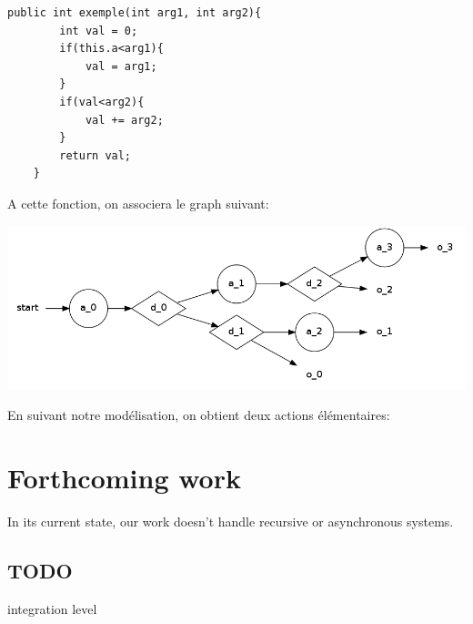 \documentclass[a4paper]{report}
\begin{document}
\begin{lstlisting}
public int exemple(int arg1, int arg2){
		int val = 0;
		if(this.a<arg1){
			val = arg1;
		}
		if(val<arg2){
			val += arg2;
		}
		return val;
	}
\end{lstlisting}
A cette fonction, on associera le graph suivant:\\


\begin{center}
   \includegraphics[scale=0.3]{../graphviz/doubleStackGraph.png}
\end{center}



En suivant notre modélisation, on obtient deux actions élémentaires:



\chapter*{Forthcoming work}

In its current state, our work doesn't handle recursive or asynchronous systems.
\section*{{\color{red} \textbf{TODO}}}
integration level


\end{document}
